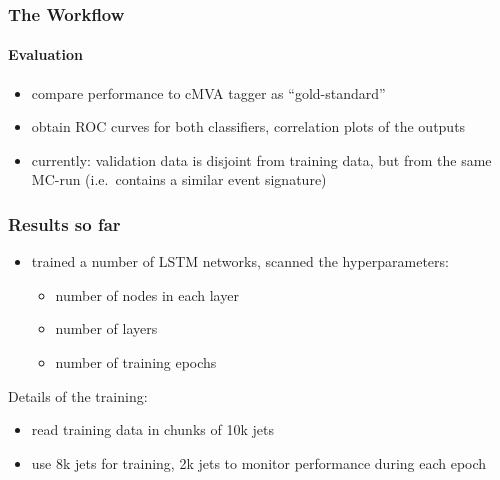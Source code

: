 \documentclass{beamer}
\begin{document}
\begin{frame}
  \frametitle{The Workflow}
  \framesubtitle{Evaluation}
  \begin{itemize}
  \item compare performance to cMVA tagger as ``gold-standard''
  \item obtain ROC curves for both classifiers, correlation plots of the outputs
  \item currently: validation data is disjoint from training data, but from the same MC-run (i.e.~contains a similar event signature)
  \end{itemize}

\end{frame}

\begin{frame}
  \frametitle{Results so far}
  \begin{itemize}
  \item trained a number of LSTM networks, scanned the hyperparameters:
    \begin{itemize}
    \item number of nodes in each layer
    \item number of layers
    \item number of training epochs
    \end{itemize}
  \end{itemize}
  
  Details of the training:
  \begin{itemize}
  \item read training data in chunks of 10k jets
  \item use 8k jets for training, 2k jets to monitor performance during each epoch
  \end{itemize}
\end{frame}
\end{document}
